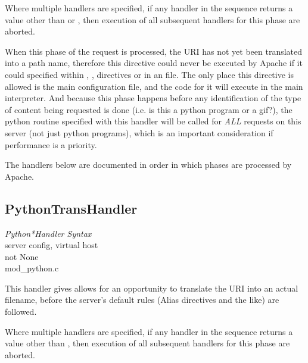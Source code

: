 Where multiple handlers are specified, if any handler in the sequence
returns a value other than  or , then
execution of all subsequent handlers for this phase are aborted.

\begin{notice}
When this phase of the request is processed, the URI has not yet
been translated into a path name, therefore this directive could never
be executed by Apache if it could specified within ,
,  directives or in an 
file. The only place this directive is allowed is the main
configuration file, and the code for it will execute in the main
interpreter. And because this phase happens before any identification
of the type of content being requested is done (i.e. is this a python
program or a gif?), the python routine specified with this handler
will be called for \emph{ALL} requests on this server (not just python
programs), which is an important consideration if performance is a
priority.
\end{notice}

 The handlers below are documented in order in
which phases are processed by Apache.

\subsection{PythonTransHandler\label{dir-handlers-th}}

\emph{Python*Handler Syntax}\\
server config, virtual host\\
not None\\
mod_python.c

This handler gives allows for an opportunity to translate the URI into
an actual filename, before the server's default rules (Alias
directives and the like) are followed.

Where multiple handlers are specified, if any handler in the sequence
returns a value other than , then execution of all
subsequent handlers for this phase are aborted.

